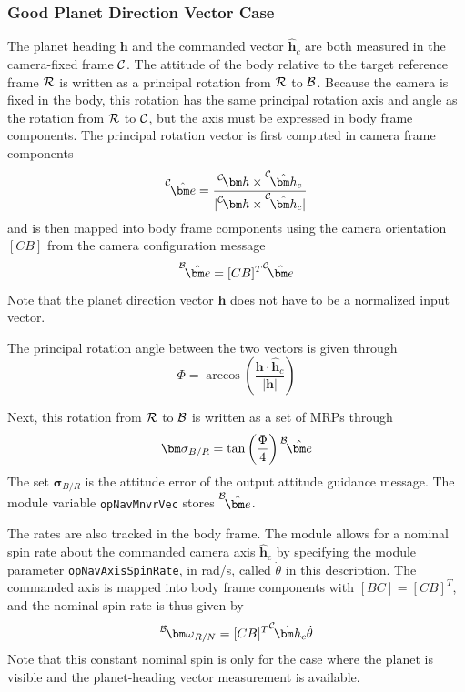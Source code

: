 \subsubsection{Good Planet Direction Vector Case}\label{sec:withHeading}
The planet heading $\bm h$ and the commanded vector $\hat{\bm h}_{c}$ are both measured in the camera-fixed frame $\cal C$.  The attitude of the body relative to the target reference frame $\cal R$ is written as a principal rotation from $\cal R$ to $\cal B$.  Because the camera is fixed in the body, this rotation has the same principal rotation axis and angle as the rotation from $\cal R$ to $\cal C$, but the axis must be expressed in body frame components.  The principal rotation vector is first computed in camera frame components
\begin{equation}
	\label{eq:ssp:1}
	\leftexp{C}{\hat{\bm e}} = \frac{\leftexp{C}{\bm h} \times \leftexp{C}{\hat{\bm h}_{c}}}{|\leftexp{C}{\bm h} \times \leftexp{C}{\hat{\bm h}_{c}}|}
\end{equation}
and is then mapped into body frame components using the camera orientation $[CB]$ from the camera configuration message
\begin{equation}
	\label{eq:ssp:1b}
	\leftexp{B}{\hat{\bm e}} = [CB]^{T} \leftexp{C}{\hat{\bm e}}
\end{equation}
Note that the planet direction vector $\bm h$ does not have to be a normalized input vector.

The principal rotation angle between the two vectors is given through
\begin{equation}
	\label{eq:ssp:2}
	\Phi = \arccos \left( \frac{\bm h  \cdot \hat{\bm h}_{c} }{|\bm h|} \right)
\end{equation}

Next, this rotation from $\cal R$ to $\cal B$ is written as a set of MRPs through
\begin{equation}
	\label{eq:ssp:3}
	\bm\sigma_{B/R} = \tan\left(\frac{\Phi}{4}\right) \leftexp{B}{\hat{\bm e}}
\end{equation}
The set $\bm\sigma_{B/R}$ is the attitude error of the output attitude guidance message.  The module variable {\tt opNavMnvrVec} stores $\leftexp{B}{\hat{\bm e}}$.

The rates are also tracked in the body frame.
The module allows for a nominal spin rate about the commanded camera axis $\hat{\bm h}_{c}$ by specifying the module parameter {\tt opNavAxisSpinRate}, in rad/s, called $\dot \theta$ in this description.  The commanded axis is mapped into body frame components with $[BC] = [CB]^{T}$, and the nominal spin rate is thus given by
\begin{equation}
	\leftexp{B}{\bm\omega}_{R/N} = [CB]^{T}\leftexp{C}{\hat{\bm h}_{c}} \dot\theta
\end{equation}
Note that this constant nominal spin is only for the case where the planet is visible and the planet-heading vector measurement is available.

